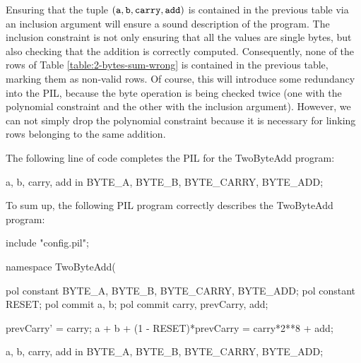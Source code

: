 Ensuring that the tuple $(\mathtt{a}, \mathtt{b}, \mathtt{carry}, \mathtt{add})$ is contained in the previous table via an inclusion argument will ensure a sound description of the program. The inclusion constraint is not only ensuring that all the values are single bytes, but also checking that the addition is correctly computed. Consequently, none of the rows of Table \ref{table:2-bytes-sum-wrong} is contained in the previous table, marking them as non-valid rows. Of course, this will introduce some redundancy into the PIL, because the byte operation is being checked twice (one with the polynomial constraint and the other with the inclusion argument). However, we can not simply drop the polynomial constraint because it is necessary for linking rows belonging to the same addition. 

The following line of code completes the PIL for the \textsf{TwoByteAdd} program:
\begin{pil}
    {a, b, carry, add} in {BYTE_A, BYTE_B, BYTE_CARRY, BYTE_ADD};
\end{pil}


    

To sum up, the following PIL program correctly describes the \textsf{TwoByteAdd} program:
\begin{pil}
    include "config.pil";
    
    namespace TwoByteAdd(%
    
    pol constant BYTE_A, BYTE_B, BYTE_CARRY, BYTE_ADD;
    pol constant RESET;
    pol commit a, b;
    pol commit carry, prevCarry, add;
    
    prevCarry' = carry;
    a + b + (1 - RESET)*prevCarry = carry*2**8 + add;
    
    {a, b, carry, add} in {BYTE_A, BYTE_B, BYTE_CARRY, BYTE_ADD};
\end{pil}

